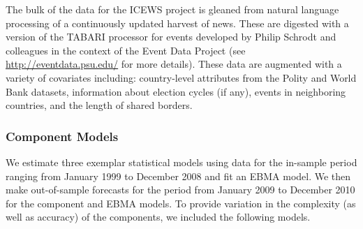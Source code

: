 \documentclass[pdftex,12pt,fullpage,oneside]{amsart}
\begin{document}

The bulk of the data for the ICEWS project is gleaned from natural
language processing of a continuously updated harvest of news. These
are digested with a version of the TABARI processor for events
developed by Philip Schrodt and colleagues in the context of the Event
Data Project (see \url{http://eventdata.psu.edu/} for more details).
These data are augmented with a variety of covariates including:
country-level attributes from the Polity and World Bank datasets,
information about election cycles (if any), events in neighboring
countries, and the length of shared borders.

\subsubsection{Component Models}

We estimate three exemplar statistical models using data for the
in-sample period ranging from January 1999 to December 2008 and fit an
EBMA model.  We then make out-of-sample forecasts for the period from
January 2009 to December 2010 for the component and EBMA models.  To
provide variation in the complexity (as well as accuracy) of the
components, we included the following models.
\end{document}
